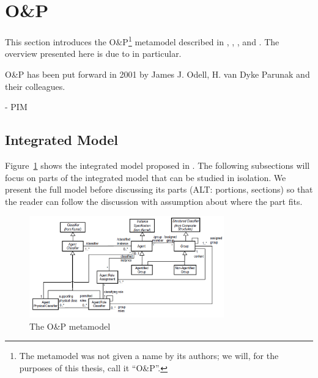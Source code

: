 \section{O\&P}

This section introduces the O\&P\footnote{The metamodel was not given a name by its authors; we will, for the purposes of this thesis, call it ``O\&P''.} metamodel described in \cite{Odell01}, \cite{Parunak02}, \cite{Odell03b}, \cite{Odell04b} and \cite{Odell05}.
The overview presented here is due to \cite{Odell05} in particular.

O\&P has been put forward in 2001 by James J. Odell, H. van Dyke Parunak and their colleagues.


- PIM

\subsection{Integrated Model}

Figure~\ref{figure:onp-metamodel} shows the integrated model proposed in \cite{Odell05}.
The following subsections will focus on parts of the integrated model that can be studied in isolation.
We present the full model before discussing its parts (ALT: portions, sections) so that the reader can follow the discussion with assumption about where the part fits.

\begin{figure}[ht]
	\centering
	\includegraphics[width=0.75\textwidth]{images/onp/onp-metamodel.png}
	\caption{The O\&P metamodel}
	\label{figure:onp-metamodel}
\end{figure}

